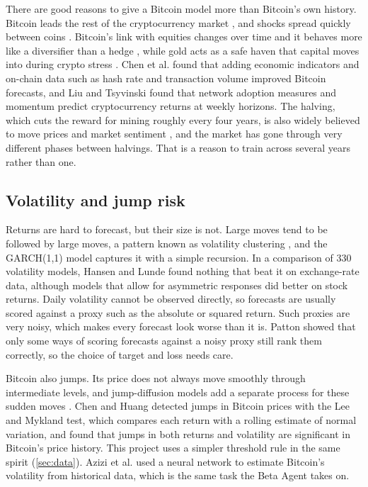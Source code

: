 There are good reasons to give a Bitcoin model more than Bitcoin's own history. Bitcoin leads the rest of the cryptocurrency market \cite{corbet2018}, and shocks spread quickly between coins \cite{huynh2020}. Bitcoin's link with equities changes over time and it behaves more like a diversifier than a hedge \cite{bouri2017}, while gold acts as a safe haven that capital moves into during crypto stress \cite{huynh2020}. Chen et al. \cite{chen2021ml} found that adding economic indicators and on-chain data such as hash rate and transaction volume improved Bitcoin forecasts, and Liu and Tsyvinski \cite{liu2021} found that network adoption measures and momentum predict cryptocurrency returns at weekly horizons. The halving, which cuts the reward for mining roughly every four years, is also widely believed to move prices and market sentiment \cite{subawa2025}, and the market has gone through very different phases between halvings. That is a reason to train across several years rather than one.

\subsection{Volatility and jump risk}

Returns are hard to forecast, but their size is not. Large moves tend to be followed by large moves, a pattern known as volatility clustering \cite{cont2001}, and the GARCH(1,1) model \cite{bollerslev1986} captures it with a simple recursion. In a comparison of 330 volatility models, Hansen and Lunde \cite{hansen2005} found nothing that beat it on exchange-rate data, although models that allow for asymmetric responses did better on stock returns. Daily volatility cannot be observed directly, so forecasts are usually scored against a proxy such as the absolute or squared return. Such proxies are very noisy, which makes every forecast look worse than it is. Patton \cite{patton2011} showed that only some ways of scoring forecasts against a noisy proxy still rank them correctly, so the choice of target and loss needs care.

Bitcoin also jumps. Its price does not always move smoothly through intermediate levels, and jump-diffusion models add a separate process for these sudden moves \cite{xu2019}. Chen and Huang \cite{chen2021jump} detected jumps in Bitcoin prices with the Lee and Mykland test, which compares each return with a rolling estimate of normal variation, and found that jumps in both returns and volatility are significant in Bitcoin's price history. This project uses a simpler threshold rule in the same spirit (\cref{sec:data}). Azizi et al. \cite{azizi2023} used a neural network to estimate Bitcoin's volatility from historical data, which is the same task the Beta Agent takes on.

